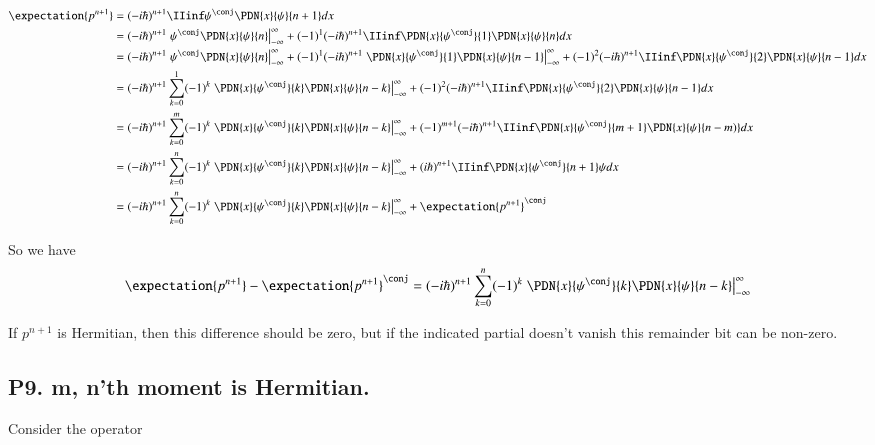 \documentclass{article}
\begin{document}
\begin{align*}
\expectation{p^{n+1}} 
&= (-i\hbar)^{n+1} \IIinf \psi^\conj \PDN{x}{\psi}{n+1} dx \\
&= 
(-i\hbar)^{n+1} \left. \psi^\conj \PDN{x}{\psi}{n} \right\vert_{-\infty}^{\infty}
+(-1)^{1}(-i\hbar)^{n+1} \IIinf \PDN{x}{\psi^\conj}{1} \PDN{x}{\psi}{n} dx 
\\
&= 
(-i\hbar)^{n+1} \left. \psi^\conj \PDN{x}{\psi}{n} \right\vert_{-\infty}^{\infty}
+(-1)^{1}(-i\hbar)^{n+1} \left. \PDN{x}{\psi^\conj}{1} \PDN{x}{\psi}{n-1} \right\vert_{-\infty}^{\infty}
+(-1)^{2}(-i\hbar)^{n+1} \IIinf \PDN{x}{\psi^\conj}{2} \PDN{x}{\psi}{n-1} dx 
\\
&= 
(-i\hbar)^{n+1} \sum_{k=0}^1
(-1)^{k}
\left. \PDN{x}{\psi^\conj}{k} \PDN{x}{\psi}{n-k} \right\vert_{-\infty}^{\infty}
+(-1)^{2}(-i\hbar)^{n+1} \IIinf \PDN{x}{\psi^\conj}{2} \PDN{x}{\psi}{n-1} dx  
\\
&= 
(-i\hbar)^{n+1} \sum_{k=0}^m
(-1)^{k}
\left. \PDN{x}{\psi^\conj}{k} \PDN{x}{\psi}{n-k} \right\vert_{-\infty}^{\infty}
+(-1)^{m+1}(-i\hbar)^{n+1} \IIinf \PDN{x}{\psi^\conj}{m+1} \PDN{x}{\psi}{n-m)} dx 
\\
&= 
(-i\hbar)^{n+1} \sum_{k=0}^n
(-1)^{k}
\left. \PDN{x}{\psi^\conj}{k} \PDN{x}{\psi}{n-k} \right\vert_{-\infty}^{\infty}
+(i\hbar)^{n+1} \IIinf \PDN{x}{\psi^\conj}{n+1} \psi dx 
\\
&= 
(-i\hbar)^{n+1} \sum_{k=0}^n
(-1)^{k}
\left. \PDN{x}{\psi^\conj}{k} \PDN{x}{\psi}{n-k} \right\vert_{-\infty}^{\infty}
+
\expectation{p^{n+1}}^\conj
\\
\end{align*}

So we have
\begin{align*}
\expectation{p^{n+1}} - \expectation{p^{n+1}}^\conj
&= 
(-i\hbar)^{n+1} \sum_{k=0}^n
(-1)^{k}
\left. \PDN{x}{\psi^\conj}{k} \PDN{x}{\psi}{n-k} \right\vert_{-\infty}^{\infty}
\\
\end{align*}

If $p^{n+1}$ is Hermitian, then this difference should be zero, but if the indicated partial doesn't vanish this
remainder bit can be non-zero.

\subsection{P9. m, n'th moment is Hermitian. }

Consider the operator 
\end{document}
